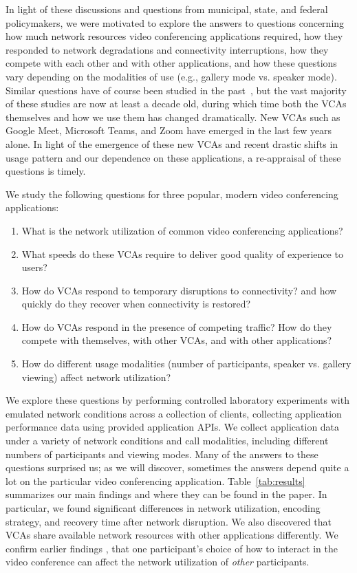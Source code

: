 In light of these discussions and questions from municipal, state, and federal
policymakers, we were motivated to explore the answers to questions concerning
how much network resources video conferencing applications required, how they
responded to network degradations and connectivity interruptions, how they
compete with each other and with other applications, and how these questions
vary depending on the modalities of use (e.g., gallery mode vs. speaker mode).
Similar questions have of course been studied in the
past~\cite{guha2005experimental, baset2004analysis, bonfiglio2008detailed,
bonfiglio2008tracking, xu2012video}, but the vast majority of these studies
are now at least a decade old, during which time both the VCAs themselves and
how we use them has changed dramatically. New VCAs such as Google Meet,
Microsoft Teams, and Zoom have emerged in the last few years alone. In light
of the emergence of these new VCAs and recent drastic shifts in usage pattern
and our dependence on these applications, a re-appraisal of these questions is
timely.

We study the following questions for three popular, modern video conferencing
applications:
\begin{enumerate}
    \itemsep=-1pt
    \item What is the network utilization of common video conferencing
        applications?
    \item What speeds do these VCAs require to deliver good quality of
        experience to users?
    \item How do VCAs respond to temporary disruptions to connectivity?
        and how quickly do they recover when connectivity is restored?
    \item How do VCAs respond in the presence of competing traffic? How do
        they compete with themselves, with other VCAs, and with other
        applications?
    \item How do different usage modalities (number of participants, speaker
        vs. gallery viewing) affect network utilization?
\end{enumerate}
\noindent
We explore these questions by performing controlled laboratory experiments
with emulated network conditions across a collection of clients, collecting
application performance data using provided application APIs. We collect
application data under a variety of network conditions and call modalities,
including different numbers of participants and viewing modes. Many of the answers
to these questions surprised us; as we will discover,
sometimes the answers depend quite a lot on the particular video
conferencing application. Table~\ref{tab:results} summarizes our main findings
and where they can be found in the paper. In particular, we found significant
differences in network utilization, encoding strategy, and recovery time after
network disruption. We also discovered that VCAs share available network
resources with other applications differently. We confirm earlier findings 
\cite{cable-labs-vca}, that one participant's choice of how to interact 
in the video conference can affect the network utilization of {\em other} participants.

